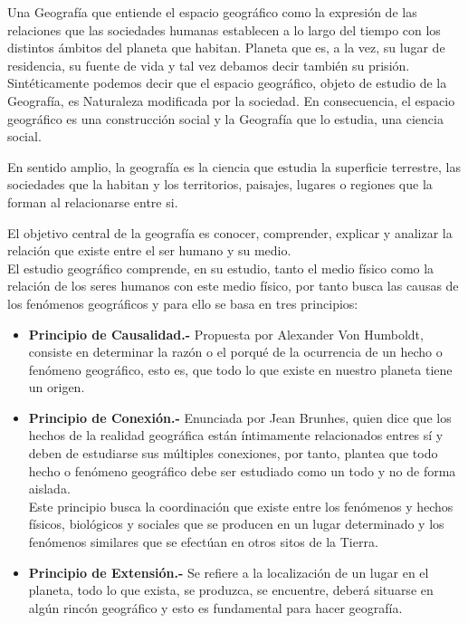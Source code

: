 \documentclass[xcolor=pdftex, x11names,table]{book}
\begin{document}
Una Geografía que entiende el espacio geográfico como la expresión de las relaciones que las sociedades humanas establecen a lo largo del tiempo con los distintos ámbitos del planeta que habitan. Planeta que es, a la vez, su lugar de residencia, su fuente de vida y tal vez debamos decir también su prisión.\\ 

Sintéticamente podemos decir que el espacio geográfico, objeto de estudio de la Geografía, es Naturaleza modificada por la sociedad. En consecuencia, el espacio geográfico es una construcción social y la Geografía que lo estudia, una ciencia social.

\begin{scaja}
En sentido amplio, la geografía es la ciencia que estudia la superficie terrestre, las sociedades que la habitan y los territorios, paisajes, lugares o regiones que la forman al relacionarse entre si.	
\end{scaja}



El objetivo central de la geografía es conocer, comprender, explicar y analizar la relación que existe entre el ser humano y su medio.\\

El estudio geográfico comprende, en su estudio, tanto el medio físico como la relación de los seres humanos con este medio físico, por tanto busca las causas de los fenómenos geográficos y para ello se basa en tres principios:\\
\begin{itemize}
	\item \textbf{Principio de Causalidad.-} Propuesta por Alexander Von  Humboldt, consiste en determinar la razón o el porqué de la ocurrencia de un hecho o fenómeno geográfico, esto es, que todo lo que existe en nuestro planeta tiene un origen.\\
	\item \textbf{Principio de Conexión.-} Enunciada por Jean Brunhes, quien dice que los hechos de la realidad geográfica están íntimamente relacionados entres sí y deben de estudiarse sus múltiples conexiones, por tanto, plantea que todo hecho o fenómeno geográfico debe ser estudiado como un todo y no de forma aislada.\\
	
	Este principio busca la coordinación que existe entre los fenómenos y hechos físicos, biológicos y sociales que se producen en un lugar determinado y los fenómenos similares que se efectúan en otros sitos de la Tierra.\\
	
	\item \textbf{Principio de Extensión.-} Se refiere a la localización de un lugar en el planeta, todo lo que exista, se produzca, se encuentre, deberá situarse en algún rincón geográfico y esto es fundamental para hacer geografía.
\end{itemize}
\end{document}
